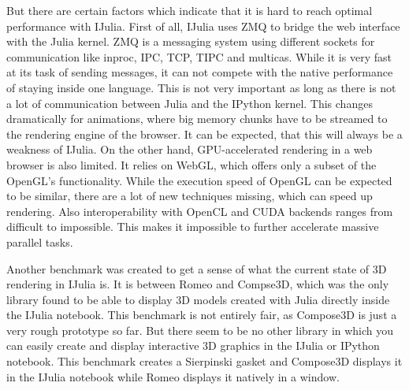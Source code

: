 But there are certain factors which indicate that it is hard to reach optimal performance with IJulia.
First of all, IJulia uses ZMQ to bridge the web interface with the Julia kernel.
ZMQ is a messaging system using different sockets for communication like inproc, IPC, TCP, TIPC and multicas.
While it is very fast at its task of sending messages, it can not compete with the native performance of staying inside one language.
This is not very important as long as there is not a lot of communication between Julia and the IPython kernel. This changes dramatically for animations, where big memory chunks have to be streamed to the rendering engine of the browser. It can be expected, that this will always be a weakness of IJulia.
On the other hand, GPU-accelerated rendering in a web browser is also limited.
It relies on WebGL, which offers only a subset of the OpenGL's functionality. While the execution speed of OpenGL can be expected to be similar, there are a lot of new techniques missing, which can speed up rendering. Also interoperability with  OpenCL and CUDA backends ranges from difficult to impossible. 
This makes it impossible to further accelerate massive parallel tasks.

Another benchmark was created to get a sense of what the current state of 3D rendering in IJulia is.
It is between Romeo and Compse3D, which was the only library found to be able to display 3D models created with Julia directly inside the IJulia notebook.
This benchmark is not entirely fair, as Compose3D is just a very rough prototype so far. 
But there seem to be no other library in which you can easily create and display interactive 3D graphics in the IJulia or IPython notebook. 
This benchmark creates a Sierpinski gasket and Compose3D displays it in the IJulia notebook while Romeo displays it natively in a window.

